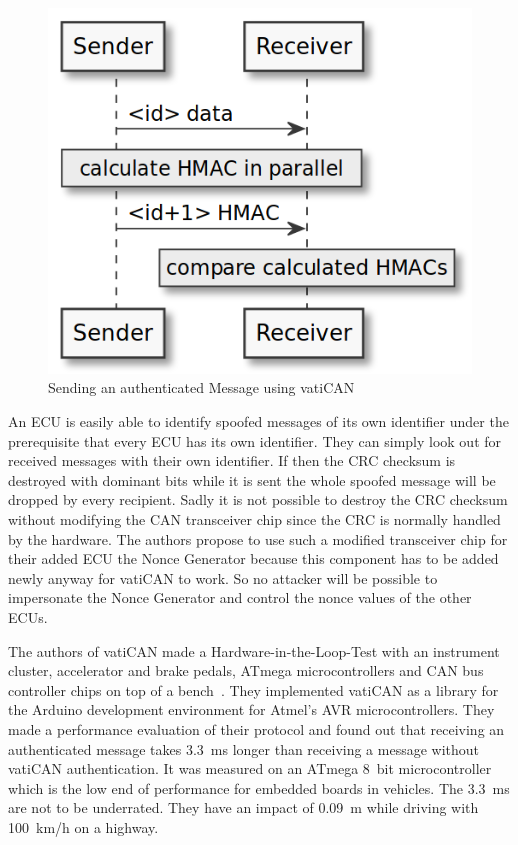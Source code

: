 \begin{figure}[ht]
    \centering
    \captionsetup{justification=centering}
	\includegraphics[width=0.8\linewidth]{Figures/vatiCAN_sending_msg.png}
	\caption[]{Sending an authenticated Message using vatiCAN}\label{fig:vatiCAN_sending_msg}
\end{figure}

An ECU is easily able to identify spoofed messages of its own identifier under
the prerequisite that every ECU has its own identifier. They can simply look out
for received messages with their own identifier. If then the CRC checksum is
destroyed with dominant bits while it is sent the whole spoofed message will be
dropped by every recipient. Sadly it is not possible to destroy the CRC checksum
without modifying the CAN transceiver chip since the CRC is normally handled by
the hardware. The authors propose to use such a modified transceiver chip for
their added ECU the Nonce Generator because this component has to be added newly
anyway for vatiCAN to work. So no attacker will be possible to impersonate the
Nonce Generator and control the nonce values of the other ECUs.

The authors of vatiCAN made a Hardware-in-the-Loop-Test with an instrument
cluster, accelerator and brake pedals, ATmega microcontrollers and CAN bus
controller chips on top of a bench~\cite{Nurnberger2016}. They implemented
vatiCAN as a library for the Arduino development environment for Atmel's AVR
microcontrollers. They made a performance evaluation of their protocol and found
out that receiving an authenticated message takes 3.3~ms longer than receiving a
message without vatiCAN authentication. It was measured on an ATmega 8~bit
microcontroller which is the low end of performance for embedded boards in
vehicles. The 3.3~ms are not to be underrated. They have an impact of 0.09~m
while driving with 100~km/h on a highway.

